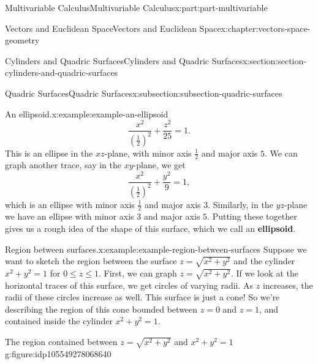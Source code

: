 \documentclass[twoside,10pt,]{book}
\newcommand{\terminology}[1]{\textbf{#1}}
\numberwithin{equation}{part}
\newlength{\qrsize}
\newlength{\previewwidth}
\begin{document}
\begin{partptx}{Multivariable Calculus}{}{Multivariable Calculus}{}{}{x:part:part-multivariable}
\begin{chapterptx}{Vectors and Euclidean Space}{}{Vectors and Euclidean Space}{}{}{x:chapter:vectors-space-geometry}
\begin{sectionptx}{Cylinders and Quadric Surfaces}{}{Cylinders and Quadric Surfaces}{}{}{x:section:section-cylinders-and-quadric-surfaces}
\begin{subsectionptx}{Quadric Surfaces}{}{Quadric Surfaces}{}{}{x:subsection:subsection-quadric-surfaces}
\begin{example}{An ellipsoid.}{x:example:example-an-ellipsoid}
%
\begin{equation*}
\frac{x^{2}}{(\frac{1}{2})^{2}}+\frac{z^{2}}{25} = 1.
\end{equation*}
This is an ellipse in the \(xz\)-plane, with minor axis \(\frac{1}{2}\) and major axis \(5\). We can graph another trace, say in the \(xy\)-plane, we get%
%
\begin{equation*}
\frac{x^{2}}{(\frac{1}{2})^{2}}+\frac{y^{2}}{9} = 1,
\end{equation*}
which is an ellipse with minor axis \(\frac{1}{2}\) and major axis \(3\). Similarly, in the \(yz\)-plane we have an ellipse with minor axis \(3\) and major axis \(5\). Putting these together gives us a rough idea of the shape of this surface, which we call an \terminology{ellipsoid}.%
\end{example}
\begin{example}{Region between surfaces.}{x:example:example-region-between-surfaces}%
Suppose we want to sketch the region between the surface \(z=\sqrt{x^{2}+y^{2}}\) and the cylinder \(x^{2}+y^{2}=1\) for \(0\leq z\leq 1\). First, we can graph \(z=\sqrt{x^{2}+y^{2}}\). If we look at the horizontal traces of this surface, we get circles of varying radii. As \(z\) increases, the radii of these circles increase as well. This surface is just a cone! So we're describing the region of this cone bounded between \(z=0\) and \(z=1\), and contained inside the cylinder \(x^{2}+y^{2}=1\).%
\end{example}
\begin{figureptx}{The region contained between \(z = \sqrt{x^2+y^2}\) and \(x^2+y^2=1\)}{g:figure:idp105549278068640}{}%
\centering
\setlength{\qrsize}{9em}
\setlength{\previewwidth}{\linewidth}
\addtolength{\previewwidth}{-\qrsize}
\begin{tcbraster}[raster columns=2, raster column skip=1pt, raster halign=center, raster force size=false, raster left skip=0pt, raster right skip=0pt]%
\begin{tcolorbox}[previewstyle, width=\previewwidth]%
%

\end{tcolorbox}
\end{tcbraster}
\end{figureptx}
\end{subsectionptx}
\end{sectionptx}
\end{chapterptx}
\end{partptx}
\end{document}
